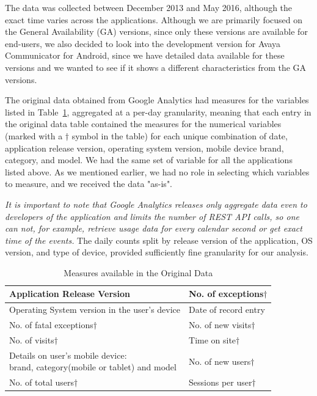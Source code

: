 \documentclass[smallcondensed]{svjour3}     %
\begin{document}
The data was collected between December 2013 and May 2016, although the exact time varies across the applications. Although we are primarily focused on the General Availability (GA) versions, since only these versions are available for end-users, we also decided to look into the development version for Avaya Communicator for Android, since we have detailed data available for these versions and we wanted to see if it shows a different characteristics from the GA versions.  

The original data obtained from Google Analytics had measures for the variables 
listed in Table~\ref{t:measures}, aggregated at a per-day granularity, meaning 
that each entry in the original data table contained the measures for the numerical 
variables (marked with a $\dagger$ symbol in the table) for each unique combination
of date, application release version, operating system version, mobile device brand, 
category, and model. We had the same set of variable for all the applications listed above.
As we mentioned earlier, we had no role in selecting which variables to measure, and we received the data "as-is".

\emph{It is important to note that Google Analytics releases only
aggregate data even to developers of the application and limits the
number of REST API calls, so one can not, for example, retrieve
usage data for every calendar second or get exact time of the
events.} The daily counts split by release version of
the application, OS version, and type of device, provided
sufficiently fine granularity for our analysis. 
\begin{table}
\caption{Measures available in the Original Data}\label{t:measures}
\begin{tabular}{|p{6.5cm}|p{4cm}|}\hline
Application Release Version & No. of exceptions$\dagger$\\\hline
Operating System version in the user's device &Date of record entry\\\hline
No. of fatal exceptions$\dagger$& No. of new visits$\dagger$\\\hline
No. of visits$\dagger$ & Time on site$\dagger$\\\hline
\pbox{6cm}{Details on user's mobile device:\\ brand, category(mobile or tablet) and model} & No. of new users$\dagger$\\\hline
No. of total users$\dagger$& Sessions per user$\dagger$\\ \hline
\end{tabular}
\vspace{-10pt}
\end{table}
\end{document}
